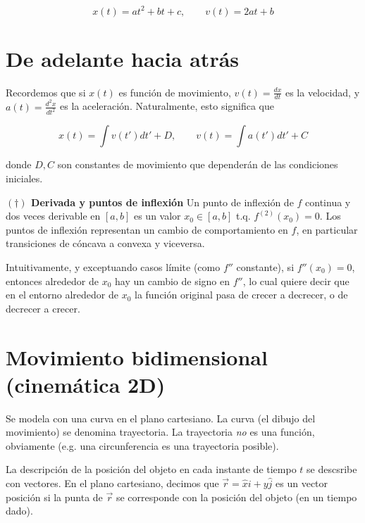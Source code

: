 \documentclass[12pt]{article}
\theoremstyle{definition}
\begin{document}
\begin{equation*}
    x(t) = at^2 + b t + c, \qquad v(t) = 2at + b
\end{equation*}





\pagebreak
\section{De adelante hacia atrás}

Recordemos que si $x(t)$ es función de movimiento, $v(t) = \frac{dx}{dt}$ es la
velocidad, y $a(t) = \frac{d^2 x}{dt^2}$ es la aceleración. Naturalmente, esto
significa que 

\begin{equation*}
    x(t) = \int v(t') dt' + D, \qquad v(t) = \int a(t') dt' + C
\end{equation*}

donde $D, C$ son constantes de movimiento que dependerán de las condiciones
iniciales.

\begin{shaded}

\textbf{$( \dagger )$ Derivada y puntos de inflexión}
Un punto de inflexión de $f$ continua y dos veces derivable en $[a, b]$ es un
valor $x_0 \in [a, b]$ t.q. $f^{(2)}(x_0) = 0$. Los puntos de inflexión
representan un cambio de comportamiento en $f$, en particular transiciones de
cóncava a convexa y viceversa.

Intuitivamente, y  exceptuando casos límite (como $f''$ constante), si $f''(x_0) = 0$, entonces alrededor de $x_0$ hay un cambio de
signo en $f''$, lo cual quiere decir que en el entorno alrededor de $x_0$ la
función original pasa de crecer a decrecer, o de decrecer a crecer.

\end{shaded}

\pagebreak 

\section{Movimiento bidimensional (cinemática 2D)}

Se modela con una curva en el plano cartesiano. La curva (el dibujo del
movimiento) se denomina trayectoria. La trayectoria \textit{no} es una función,
obviamente (e.g. una circunferencia es una trayectoria posible).

La descripción de la posición del objeto en cada instante de tiempo $t$ se
descsribe con vectores. En el plano cartesiano, decimos que $\vec{r} = \hat{x}i
+ y \hat{j}$
es un vector posición si la punta de $\vec{r}$ se corresponde con la posición
del objeto (en un tiempo dado).
\end{document}
